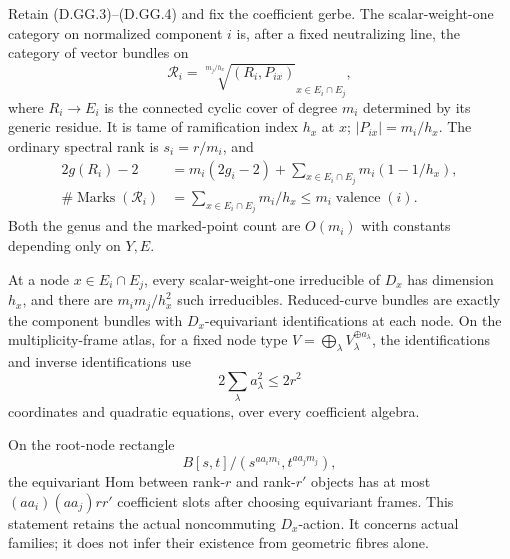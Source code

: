 \begin{proposition}
\label{D:SNC-general-residual-category}
Retain (D.GG.3)--(D.GG.4) and fix the coefficient gerbe.
The scalar-weight-one category on normalized component
\(i\) is, after a fixed neutralizing line, the category
of vector bundles on
\[
 \mathcal R_i=
   \sqrt[m_j/h_x]{(R_i,P_{ix})}_{x\in E_i\cap E_j},
                                                        \tag{D.GG.7}
\]
where \(R_i\to E_i\) is the connected cyclic cover of
degree \(m_i\) determined by its generic residue.
It is tame of ramification index \(h_x\) at \(x\);
\(|P_{ix}|=m_i/h_x\). The ordinary spectral rank is
\(s_i=r/m_i\), and
\[
 \begin{split}
 2g(R_i)-2
   &=m_i(2g_i-2)+
                   \sum_{x\in E_i\cap E_j}m_i(1-1/h_x),\\
 \#\operatorname{Marks}(\mathcal R_i)
   &=\sum_{x\in E_i\cap E_j}m_i/h_x
     \leq m_i\operatorname{valence}(i).
 \end{split}                                           \tag{D.GG.8}
\]
Both the genus and the marked-point count are \(O(m_i)\)
with constants depending only on \(Y,E\).

At a node \(x\in E_i\cap E_j\), every scalar-weight-one
irreducible of \(D_x\) has dimension \(h_x\), and there
are \(m_i m_j/h_x^2\) such irreducibles.
Reduced-curve bundles are exactly the component bundles
with \(D_x\)-equivariant identifications at each node.
On the multiplicity-frame atlas, for a fixed node type
\(V=\bigoplus_\lambda V_\lambda^{\oplus a_\lambda}\),
the identifications and inverse identifications use
\[
       2\sum_\lambda a_\lambda^2\leq 2r^2             \tag{D.GG.9}
\]
coordinates and quadratic equations, over every
coefficient algebra.

On the root-node rectangle
\[
 B[s,t]/(s^{a a_i m_i},t^{a a_j m_j}),                 \tag{D.GG.10}
\]
the equivariant Hom between rank-\(r\) and rank-\(r'\)
objects has at most
\((a a_i)(a a_j)rr'\) coefficient slots after choosing
equivariant frames. This statement retains the actual
noncommuting \(D_x\)-action. It concerns actual
families; it does not infer their existence from
geometric fibres alone.
\end{proposition}

